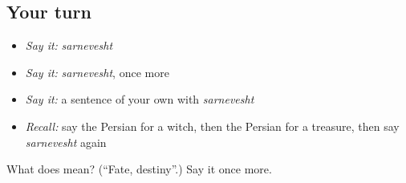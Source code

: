 \subsection*{Your turn}
\begin{itemize}
\raggedright
  \item \emph{Say it:} \emph{sarnevesht}
  \item \emph{Say it:} \emph{sarnevesht}, once more
  \item \emph{Say it:} a sentence of your own with \emph{sarnevesht}
  \item \emph{Recall:} say the Persian for a witch, then the Persian for a treasure, then say \emph{sarnevesht} again
\end{itemize}

\begin{tcolorbox}[breakable,colback=teal!4,colframe=teal!35!black,title={Before you move on}]
What does  mean? (\textquotedblleft{}Fate, destiny\textquotedblright{}.) Say it once more.
\end{tcolorbox}
